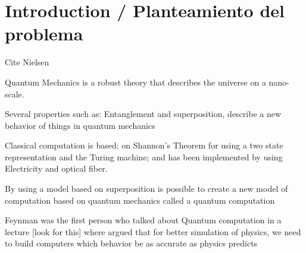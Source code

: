 \section{Introduction / Planteamiento del problema}


 {\huge Cite Nielsen}

Quantum Mechanics is a robust theory that describes the universe on a nano-scale.

Several properties such as: Entanglement and superposition, describe a new behavior of things in quantum mechanics

Classical computation is based: on Shannon's Theorem for using a two state representation and the Turing machine; and has been implemented by using Electricity and optical fiber.

By using a model based on superposition is possible to create a new model of computation based on quantum mechanics called a quantum computation

Feynman was the first person who talked about  Quantum computation in a lecture [look for this] where argued that for better simulation of physics, we need to build computers which behavior be as accurate as  physics predicts